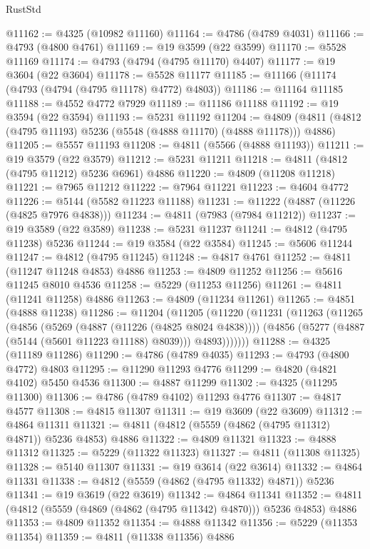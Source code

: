 \begin{lexlean}{RustStd}
\begin{coremodule}
{\begin{coremodule}
{{{{{{{{{{{{{{{{{{{{{{{{{{{{{{{{{{{{{{{{{{{{{{{{{{{{{{{{{{{{{{{{{{{{{{{{{{{{{{{{@11162 := @4325 (@10982 @11160)
@11164 := @4786 (@4789 @4031)
@11166 := @4793 (@4800 @4761)
@11169 := @19 @3599 (@22 @3599)
@11170 := @5528 @11169
@11174 := @4793 (@4794 (@4795 @11170) @4407)
@11177 := @19 @3604 (@22 @3604)
@11178 := @5528 @11177
@11185 := @11166 (@11174 (@4793 (@4794 (@4795 @11178) @4772) @4803))
@11186 := @11164 @11185
@11188 := @4552 @4772 @7929
@11189 := @11186 @11188
@11192 := @19 @3594 (@22 @3594)
@11193 := @5231 @11192
@11204 := @4809 (@4811 (@4812 (@4795 @11193) @5236 (@5548 (@4888 @11170) (@4888 @11178))) @4886)
@11205 := @5557 @11193
@11208 := @4811 (@5566 (@4888 @11193))
@11211 := @19 @3579 (@22 @3579)
@11212 := @5231 @11211
@11218 := @4811 (@4812 (@4795 @11212) @5236 @6961) @4886
@11220 := @4809 (@11208 @11218)
@11221 := @7965 @11212
@11222 := @7964 @11221
@11223 := @4604 @4772
@11226 := @5144 (@5582 @11223 @11188)
@11231 := @11222 (@4887 (@11226 (@4825 @7976 @4838)))
@11234 := @4811 (@7983 (@7984 @11212))
@11237 := @19 @3589 (@22 @3589)
@11238 := @5231 @11237
@11241 := @4812 (@4795 @11238) @5236
@11244 := @19 @3584 (@22 @3584)
@11245 := @5606 @11244
@11247 := @4812 (@4795 @11245)
@11248 := @4817 @4761
@11252 := @4811 (@11247 @11248 @4853) @4886
@11253 := @4809 @11252
@11256 := @5616 @11245 @8010 @4536
@11258 := @5229 (@11253 @11256)
@11261 := @4811 (@11241 @11258) @4886
@11263 := @4809 (@11234 @11261)
@11265 := @4851 (@4888 @11238)
@11286 := @11204
    (@11205
      (@11220
        (@11231
          (@11263
            (@11265
              (@4856
                (@5269 (@4887 (@11226 (@4825 @8024 @4838))))
                (@4856 (@5277 (@4887 (@5144 (@5601 @11223 @11188) @8039))) @4893)))))))
@11288 := @4325 (@11189 @11286)
@11290 := @4786 (@4789 @4035)
@11293 := @4793 (@4800 @4772) @4803
@11295 := @11290 @11293 @4776
@11299 := @4820 (@4821 @4102) @5450 @4536
@11300 := @4887 @11299
@11302 := @4325 (@11295 @11300)
@11306 := @4786 (@4789 @4102) @11293 @4776
@11307 := @4817 @4577
@11308 := @4815 @11307
@11311 := @19 @3609 (@22 @3609)
@11312 := @4864 @11311
@11321 := @4811 (@4812 (@5559 (@4862 (@4795 @11312) @4871)) @5236 @4853) @4886
@11322 := @4809 @11321
@11323 := @4888 @11312
@11325 := @5229 (@11322 @11323)
@11327 := @4811 (@11308 @11325)
@11328 := @5140 @11307
@11331 := @19 @3614 (@22 @3614)
@11332 := @4864 @11331
@11338 := @4812 (@5559 (@4862 (@4795 @11332) @4871)) @5236
@11341 := @19 @3619 (@22 @3619)
@11342 := @4864 @11341
@11352 := @4811 (@4812 (@5559 (@4869 (@4862 (@4795 @11342) @4870))) @5236 @4853) @4886
@11353 := @4809 @11352
@11354 := @4888 @11342
@11356 := @5229 (@11353 @11354)
@11359 := @4811 (@11338 @11356) @4886
}}}}}}}}}}}}}}}}}}}}}}}}}}}}}}}}}}}}}}}}}}}}}}}}}}}}}}}}}}}}}}}}}}}}}}}}}}}}}}}}
\end{coremodule}}
\end{coremodule}
\end{lexlean}
